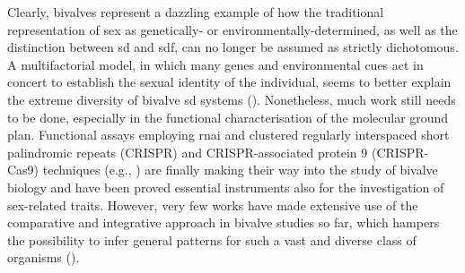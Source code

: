 Clearly, bivalves represent a dazzling example of how the traditional representation of sex as genetically- or environmentally-determined, as well as the distinction between \gls{sd} and \gls{sdf}, can no longer be assumed as strictly dichotomous. A multifactorial model, in which many genes and environmental cues act in concert to establish the sexual identity of the individual, seems to better explain the extreme diversity of bivalve \gls{sd} systems (). Nonetheless, much work still needs to be done, especially in the functional characterisation of the molecular ground plan. Functional assays employing \gls{rnai} and clustered regularly interspaced short palindromic repeats (CRISPR) and CRISPR-associated protein 9 (CRISPR-Cas9) techniques (e.g., ) are finally making their way into the study of bivalve biology and have been proved essential instruments also for the investigation of sex-related traits. However, very few works have made extensive use of the comparative and integrative approach in bivalve studies so far, which hampers the possibility to infer general patterns for such a vast and diverse class of organisms ().

% 